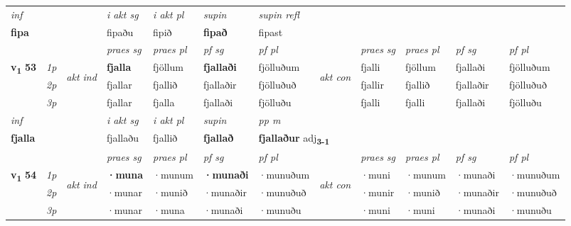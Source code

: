 \begin{longtable}[l]{X>{\footnotesize\itshape}llXXXXlXXXX}
\cmidrule{4-7}
   {\textit{inf}} & &  & \textit{i akt sg} & \textit{i akt pl}    & \textit{supin} & \textit{supin refl}  \\*
  {\textbf{fipa}} & && fipaðu  & fipið    &  \textbf{fipað} & fipast  \\*

\midrule

 & &   & \textit{praes sg}  & \textit{praes pl}    & \textit{ pf sg} & \textit{pf pl} & & \textit{praes sg}  & \textit{praes pl}    & \textit{pf sg} & \textit{pf pl }  \\ \cmidrule{4-7} \cmidrule{9-12}
 \multirow{2}{*}{{{\textbf{v{\textsubscript{1}}} \Large{\textbf{53}}}}}  & 1p & \multirow{3}{*}{\begin{turn}{90}\textit{akt ind}\end{turn}} & \textbf{fjalla} & fjöllum & \textbf{fjallaði} & fjölluðum & \multirow{3}{*}{\begin{turn}{90}\textit{akt con}\end{turn}} &fjalli & fjöllum & fjallaði & fjölluðum\\*
 & 2p &  &  fjallar  & fjallið & fjallaðir & fjölluðuð & & fjallir & fjallið & fjallaðir & fjölluðuð \\*
 & 3p &  & fjallar & fjalla & fjallaði & fjölluðu & & fjalli & fjalli& fjallaði & fjölluðu \\*
\cmidrule{4-7} \cmidrule{9-12}

   {\textit{inf}} & &  & \textit{i akt sg} & \textit{i akt pl}    & \textit{supin}  & \textit{pp m} \\*
  {\textbf{fjalla}} & && fjallaðu  & fjallið    &  \textbf{fjallað}  & \multicolumn{2}{l}{\textbf{fjallaður} adj\textbf{\textsubscript{3-1}}} \\*

\midrule

 & &   & \textit{praes sg}  & \textit{praes pl}    & \textit{ pf sg} & \textit{pf pl} & & \textit{praes sg}  & \textit{praes pl}    & \textit{pf sg} & \textit{pf pl }  \\ \cmidrule{4-7} \cmidrule{9-12}
 \multirow{2}{*}{{{\textbf{v{\textsubscript{1}}} \Large{\textbf{54}}}}}  & 1p & \multirow{3}{*}{\begin{turn}{90}\textit{akt ind}\end{turn}} & \textbf{·muna} & ·munum & \textbf{·munaði} & ·munuðum & \multirow{3}{*}{\begin{turn}{90}\textit{akt con}\end{turn}} &·muni & ·munum & ·munaði & ·munuðum\\*
 & 2p &  &  ·munar  & ·munið & ·munaðir & ·munuðuð & & ·munir & ·munið & ·munaðir & ·munuðuð \\*
 & 3p &  & ·munar & ·muna & ·munaði & ·munuðu & & ·muni & ·muni& ·munaði & ·munuðu \\*
\cmidrule{4-7} \cmidrule{9-12}


\end{longtable}
